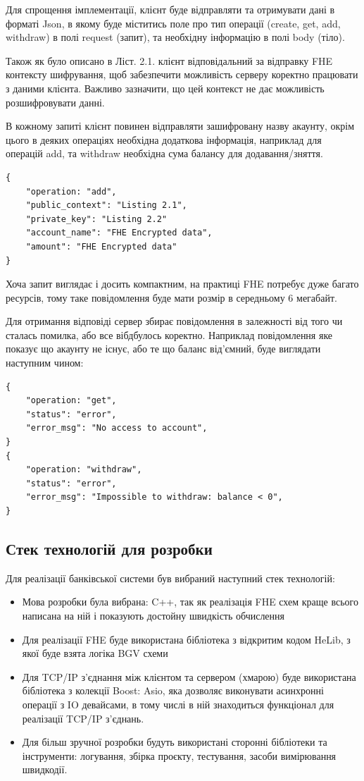 Для спрощення імплементації, клієнт буде відправляти та отримувати дані в форматі Json, в
якому буде міститись поле про тип операції (create, get, add, withdraw) в полі 
request (запит), та необхідну інформацію в полі body (тіло).

Також як було описано в Ліст. 2.1. клієнт відповідальний за відправку FHE контексту шифрування,
щоб забезпечити можливість серверу коректно працювати з даними клієнта. Важливо зазначити, що
цей контекст не дає можливість розшифровувати данні.

В кожному запиті клієнт повинен відправляти зашифровану назву акаунту, окрім цього в деяких
операціях необхідна додаткова інформація, наприклад для операцій add, та withdraw 
необхідна сума балансу для додавання/зняття.

\begin{lstlisting}[breaklines, caption={Json формат запиту клієнта до сервера}, captionpos=b]
{
    "operation: "add",
    "public_context": "Listing 2.1",
    "private_key": "Listing 2.2"
    "account_name": "FHE Encrypted data",
    "amount": "FHE Encrypted data"
}
\end{lstlisting}
Хоча запит виглядає і досить компактним, на практиці FHE потребує дуже багато ресурсів,
тому таке повідомлення буде мати розмір в середньому 6 мегабайт.

Для отримання відповіді сервер збирає повідомлення в залежності від того чи сталась помилка,
або все вібдбулось коректно. Наприклад повідомлення яке показує що акаунту не існує, або
те що баланс від'ємний, буде виглядати наступним чином:

\begin{lstlisting}[breaklines, caption={Json формат помилки клієнту від сервера}, captionpos=b]
{
    "operation: "get",
    "status": "error",
    "error_msg": "No access to account",
}
{
    "operation: "withdraw",
    "status": "error",
    "error_msg": "Impossible to withdraw: balance < 0",
}
\end{lstlisting}


\subsection{Стек технологій для розробки}
Для реалізації банківської системи був вибраний наступний стек технологій:
\begin{itemize}

    \item{Мова розробки була вибрана: C++, так як реалізація FHE схем краще всього написана
на ній і показують достойну швидкість обчислення}
    \item{Для реалізації FHE буде використана бібліотека з відкритим кодом HeLib, з
якої буде взята логіка BGV схеми}
    \item{Для TCP/IP з'єднання між клієнтом та сервером (хмарою) буде використана бібліотека
з колекції Boost: Asio, яка дозволяє виконувати асинхронні операції з IO девайсами, в тому
числі в ній знаходиться функціонал для реалізації TCP/IP з'єднань.}
    \item{Для більш зручної розробки будуть використані сторонні бібліотеки та інструменти:
логування, збірка проєкту, тестування, засоби вимірювання швидкодії.}
\end{itemize}

